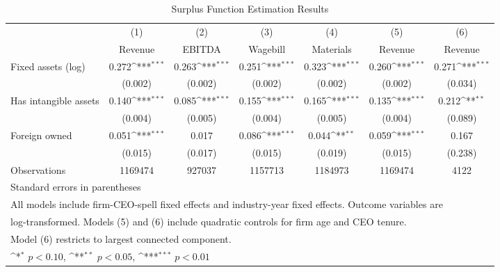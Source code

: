 \begin{table}[htbp]\centering
\def\sym#1{\ifmmode^{#1}\else\(^{#1}\)\fi}
\caption{Surplus Function Estimation Results}
\begin{tabular}{l*{6}{c}}
\toprule
                    &\multicolumn{1}{c}{(1)}&\multicolumn{1}{c}{(2)}&\multicolumn{1}{c}{(3)}&\multicolumn{1}{c}{(4)}&\multicolumn{1}{c}{(5)}&\multicolumn{1}{c}{(6)}\\
                    &\multicolumn{1}{c}{Revenue}&\multicolumn{1}{c}{EBITDA}&\multicolumn{1}{c}{Wagebill}&\multicolumn{1}{c}{Materials}&\multicolumn{1}{c}{Revenue}&\multicolumn{1}{c}{Revenue}\\
\midrule
Fixed assets (log)  &       0.272\sym{***}&       0.263\sym{***}&       0.251\sym{***}&       0.323\sym{***}&       0.260\sym{***}&       0.271\sym{***}\\
                    &     (0.002)         &     (0.002)         &     (0.002)         &     (0.002)         &     (0.002)         &     (0.034)         \\
\addlinespace
Has intangible assets&       0.140\sym{***}&       0.085\sym{***}&       0.155\sym{***}&       0.165\sym{***}&       0.135\sym{***}&       0.212\sym{**} \\
                    &     (0.004)         &     (0.005)         &     (0.004)         &     (0.005)         &     (0.004)         &     (0.089)         \\
\addlinespace
Foreign owned       &       0.051\sym{***}&       0.017         &       0.086\sym{***}&       0.044\sym{**} &       0.059\sym{***}&       0.167         \\
                    &     (0.015)         &     (0.017)         &     (0.015)         &     (0.019)         &     (0.015)         &     (0.238)         \\
\midrule
Observations        &     1169474         &      927037         &     1157713         &     1184973         &     1169474         &        4122         \\
\bottomrule
\multicolumn{7}{l}{\footnotesize Standard errors in parentheses}\\
\multicolumn{7}{l}{\footnotesize All models include firm-CEO-spell fixed effects and industry-year fixed effects. Outcome variables are}\\
\multicolumn{7}{l}{\footnotesize log-transformed. Models (5) and (6) include quadratic controls for firm age and CEO tenure.}\\
\multicolumn{7}{l}{\footnotesize Model (6) restricts to largest connected component.}\\
\multicolumn{7}{l}{\footnotesize \sym{*} \(p<0.10\), \sym{**} \(p<0.05\), \sym{***} \(p<0.01\)}\\
\end{tabular}
\end{table}
